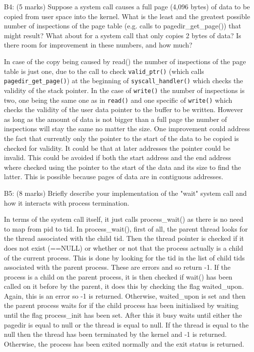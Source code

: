 
\noindent B4: (5 marks)
Suppose a system call causes a full page (4,096 bytes) of data
to be copied from user space into the kernel.  What is the least and the greatest possible number of inspections of the page table (e.g. calls to pagedir\_get\_page()) that might result?  What about for a system call that only copies 2 bytes of data?  Is there room for improvement in these numbers, and how much?


In case of the copy being caused by read() the number of inspections of the page table is just one, due to the call to check \texttt{valid\_ptr()} (which calls \texttt{pagedir\_get\_page()}) at the beginning of \texttt{syscall\_handler()} which checks the validity of the stack pointer. In the case of \texttt{write()} the number of inspections is two, one being the same one as in \texttt{read()} and one specific of \texttt{write()} which checks the validity of the user data pointer to the buffer to be written.
However as long as the amount of data is not bigger than a full page the number of inspections will stay the same no matter the size.
One improvement could address the fact that currently only the pointer to the start of the data to be copied is checked for validity. It could be that at later addresses the pointer could be invalid. This could be avoided if both the start address and the end address where checked using the pointer to the start of the data and its size to find the latter. This is possible because pages of data are in contiguous addresses.


\noindent B5: (8 marks)
Briefly describe your implementation of the "wait" system call
and how it interacts with process termination.


In terms of the system call itself, it just calls process\_wait() as there is no need to map from pid to tid. In process\_wait(), first of all, the parent thread looks for the thread associated with the child tid. Then the thread pointer is checked if it does not exist (==NULL) or whether or not that the process actually is a child of the current process. This is done by looking for the tid in the list of child tids associated with the parent process. These are errors and so return -1.
If the process is a child on the parent process, it is then checked if wait() has been called on it before by the parent, it does this by checking the flag waited\_upon. Again, this is an error so -1 is returned. Otherwise, waited\_upon is set and then the parent process waits for if the child process has been initialised by waiting until the flag process\_init has been set. After this it busy waits until either the pagedir is equal to null or the thread is equal to null. If the thread is equal to the null then the thread has been terminated by the kernel and -1 is returned. Otherwise, the process has been exited normally and the exit status is returned.


